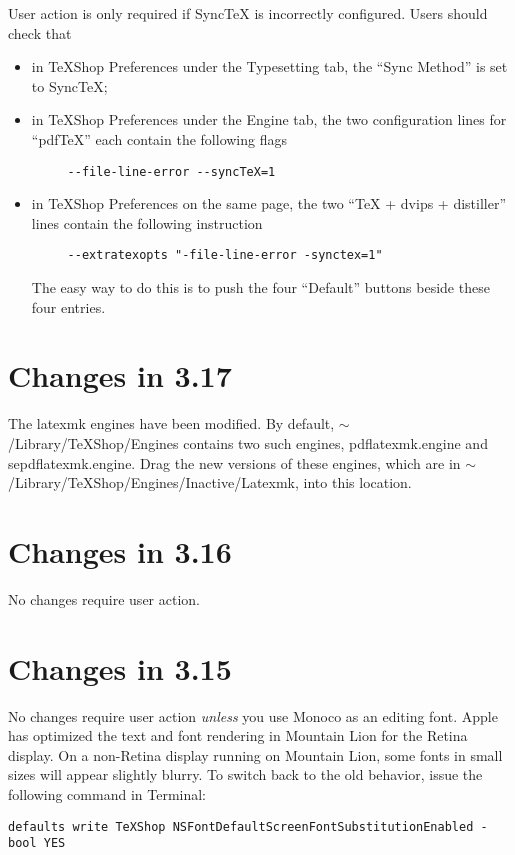 \documentclass[11pt, oneside]{amsart}
\begin{document}
User action is only required if SyncTeX is incorrectly configured. Users should
check that
\begin{itemize}
\item in TeXShop Preferences under the Typesetting tab, the ``Sync Method'' is set to SyncTeX;
\item in TeXShop Preferences under the Engine tab, the two configuration lines for ``pdfTeX''
each contain the following flags
\begin{verbatim}
     --file-line-error --syncTeX=1
\end{verbatim}
\item in TeXShop Preferences on the same page, the two ``TeX + dvips + distiller'' lines
contain the following instruction
\begin{verbatim}
     --extratexopts "-file-line-error -synctex=1"
\end{verbatim}
	The easy way to do this is to push the four ``Default'' buttons beside these four entries.
\end{itemize}

\section{Changes in 3.17}

The latexmk engines have been modified. By default, $\sim$/Library/TeXShop/Engines contains two such engines, pdflatexmk.engine and sepdflatexmk.engine. Drag the new versions of these engines,
which are in $\sim$/Library/TeXShop/Engines/Inactive/Latexmk, into this location.


\section{Changes in 3.16}

No changes require user action.

\section{Changes in 3.15}

No changes require user action {\em unless} you use Monoco as an editing font. Apple has optimized the
text and font rendering in Mountain Lion for the Retina display. On a non-Retina display running on Mountain Lion, some fonts in small sizes will appear slightly blurry. To switch back to the old behavior, issue the following
command in Terminal:
\begin{verbatim}
defaults write TeXShop NSFontDefaultScreenFontSubstitutionEnabled -bool YES
\end{verbatim}
\end{document}
